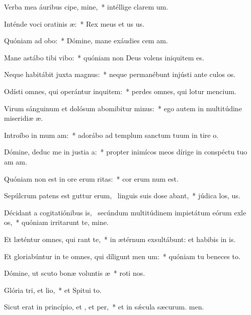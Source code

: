 \item Verba mea áuribus cipe, mine,~* intéllige clarem um.
\item Inténde voci oratinis æ:~* Rex meus et us us.
\item Quóniam ad  obo:~* Dómine, mane exáudies cem am.
\item Mane astábo tibi  vibo:~* quóniam non Deus volens iniquitem  es.
\item Neque habitábit juxta  magnus:~* neque permanébunt injústi ante culos os.
\item Odísti omnes, qui operántur inquitem:~* perdes omnes, qui lotur mencium.
\item Virum sánguinum et dolósum abomibitur minus:~* ego autem in multitúdine miseridiæ æ.
\item Introíbo in mum am:~* adorábo ad templum sanctum tuum in tire o.
\item Dómine, deduc me in justia a:~* propter inimícos meos dírige in conspéctu tuo am am.
\item Quóniam non est in ore erum ritas:~* cor erum num est.
\item Sepúlcrum patens est guttur erum,~\pscross{} linguis suis dose abant,~* júdica los, us.
\item Décidant a cogitatiónibus is,~\pscross{} secúndum multitúdinem impietátum eórum exle os,~* quóniam irritarunt te, mine.
\item Et læténtur omnes, qui rant  te,~* in ætérnum exsultábunt: et habibis in is.
\item Et gloriabúntur in te omnes, qui díligunt men um:~* quóniam tu beneces to.
\item Dómine, ut scuto bonæ voluntis æ~* roti nos.
\item Glória tri, et lio,~* et Spitui to.
\item Sicut erat in princípio, et , et per,~* et in sǽcula sæcurum. men.
